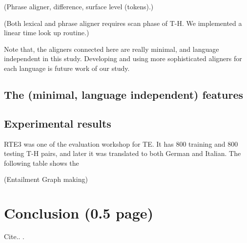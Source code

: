 \documentclass[11pt,letterpaper]{article}
\begin{document}
(Phrase aligner, difference, surface level (tokens).)  

(Both lexical and phrase aligner requires scan phase of T-H. We
implemented a linear time look up routine.)

Note that, the aligners connected here are really minimal, and
language independent in this study. Developing and using more
sophisticated aligners for each language is future work of our study.

\subsection{The (minimal, language independent) features} 



\subsection{Experimental results} 
RTE3 was one of the evaluation workshop for TE. It has 800 training
and 800 testing T-H pairs, and later it was translated to both German
and Italian. The following table shows the 


(Entailment Graph making)


\section{Conclusion (0.5 page)} 

   Cite.. \cite{Katz:1987}.




\end{document}

